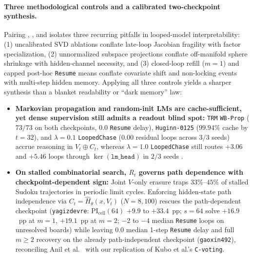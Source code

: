\documentclass[10pt,letterpaper]{article}
\begin{document}
\paragraph{Three methodological controls and a calibrated two-checkpoint synthesis.} Pairing , , and  isolates three recurring pitfalls in looped-model interpretability: (1) uncalibrated SVD ablations conflate late-loop Jacobian fragility with factor specialization, (2) unnormalized subspace projections conflate off-manifold sphere shrinkage with hidden-channel necessity, and (3) closed-loop refill ($m=1$) and capped post-hoc \texttt{Resume} means conflate covariate shift and non-locking events with multi-step hidden memory. Applying all three controls yields a sharper synthesis than a blanket readability or ``dark memory'' law:
\begin{itemize}
  \item \textbf{Markovian propagation and random-init LMs are cache-sufficient, yet dense supervision still admits a readout blind spot:} \texttt{TRM} \texttt{WB-Prop} ($73/73$ on both checkpoints, $0.0$ \texttt{Resume} delay), \texttt{Huginn-0125} ($99.94\%$ cache by $t=32$), and $\lambda=0.1$ \texttt{LoopedChase} ($0.00$ residual loops across $3/3$ seeds) accrue reasoning in $V_t \oplus C_t$, whereas $\lambda=1.0$ \texttt{LoopedChase} still routes $+3.06$ and $+5.46$ loops through $\ker(\texttt{lm\_head})$ in $2/3$ seeds \cite{sharma2026dense}.
  \item \textbf{On stalled combinatorial search, $R_t$ governs path dependence with checkpoint-dependent sign:} Joint $V$-only erasure traps $33\%$--$45\%$ of stalled Sudoku trajectories in periodic limit cycles. Enforcing hidden-state path independence via $C_t = \hat{H}_\theta(x,V_t)$ ($N=8{,}100$) rescues the path-dependent checkpoint (\texttt{yagizdevre}: $\mathrm{PI}_{\mathrm{cell}}(64)$ $+9.9$ to $+33.4$~pp; $s=64$ solve $+16.9$~pp at $m=1$, $+19.1$~pp at $m=2$; $-2$ to $-4$ median \texttt{Resume} loops on unresolved boards) while leaving $0.0$ median 1-step \texttt{Resume} delay and full $m \ge 2$ recovery on the already path-independent checkpoint (\texttt{gaoxin492}), reconciling Anil et al.\ \cite{anil2022path} with our replication of Kubo et al.'s \cite{kubo2026cvoting} \texttt{C-voting}.
\end{itemize}
\end{document}
